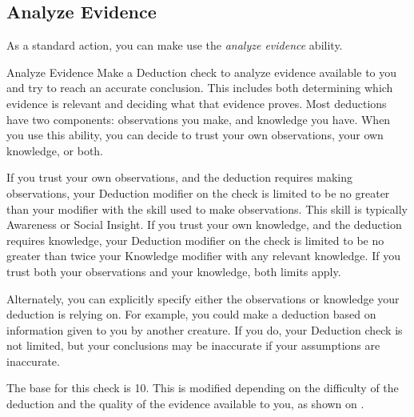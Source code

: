     \subsection{Analyze Evidence}
        As a standard action, you can make use the \textit{analyze evidence} ability.
        \begin{freeability}{Analyze Evidence}
            Make a Deduction check to analyze evidence available to you and try to reach an accurate conclusion.
            This includes both determining which evidence is relevant and deciding what that evidence proves.
            Most deductions have two components: observations you make, and knowledge you have.
            When you use this ability, you can decide to trust your own observations, your own knowledge, or both.

            If you trust your own observations, and the deduction requires making observations, your Deduction modifier on the check is limited to be no greater than your modifier with the skill used to make observations.
            This skill is typically Awareness or Social Insight.
            If you trust your own knowledge, and the deduction requires knowledge, your Deduction modifier on the check is limited to be no greater than twice your Knowledge modifier with any relevant knowledge.
            If you trust both your observations and your knowledge, both limits apply.

            Alternately, you can explicitly specify either the observations or knowledge your deduction is relying on.
            For example, you could make a deduction based on information given to you by another creature.
            If you do, your Deduction check is not limited, but your conclusions may be inaccurate if your assumptions are inaccurate.

            The base  for this check is 10.
            This  is modified depending on the difficulty of the deduction and the quality of the evidence available to you, as shown on .
        \end{freeability}

